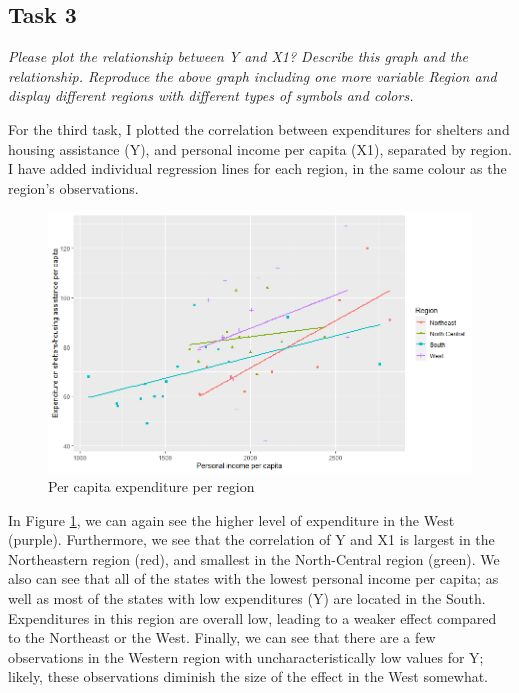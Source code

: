 \documentclass[12pt,a4paper]{article}
\begin{document}
\subsection{Task 3}
\textit{Please plot the relationship between \emph{Y} and \emph{X1}? Describe this graph and the relationship. Reproduce the above graph including one more variable \emph{Region} and display different regions with different types of symbols and colors.}
\vspace{0.5cm}

For the third task, I plotted the correlation between expenditures for shelters and housing assistance (Y), and personal income per capita (X1), separated by region. I have added individual regression lines for each region, in the same colour as the region’s observations. 



\begin{figure}[h]
	\centering
	\includegraphics[width=\textwidth]{PS1_Plot3}
	\caption{Per capita expenditure per region}
	\label{fig:reg_x1_plot}
\end{figure}


In Figure \ref{fig:reg_x1_plot}, we can again see the higher level of expenditure in the West (purple). Furthermore, we see that the correlation of Y and X1 is largest in the Northeastern region (red), and smallest in the North-Central region (green). We also can see that all of the states with the lowest personal income per capita; as well as most of the states with low expenditures (Y) are located in the South. Expenditures in this region are overall low, leading to a weaker effect compared to the Northeast or the West. Finally, we can see that there are a few observations in the Western region with uncharacteristically low values for Y; likely, these observations diminish the size of the effect in the West somewhat.
\end{document}
